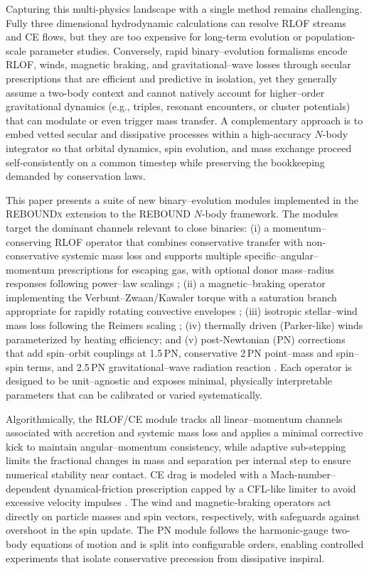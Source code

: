 \documentclass[11pt]{article}
\begin{document}
Capturing this multi-physics landscape with a single method remains challenging. Fully three dimensional hydrodynamic calculations can resolve RLOF streams and CE flows, but they are too expensive for long-term evolution or population-scale parameter studies. Conversely, rapid binary–evolution formalisms encode RLOF, winds, magnetic braking, and gravitational–wave losses through secular prescriptions that are efficient and predictive in isolation, yet they generally assume a two-body context and cannot natively account for higher–order gravitational dynamics (e.g., triples, resonant encounters, or cluster potentials) that can modulate or even trigger mass transfer. A complementary approach is to embed vetted secular and dissipative processes within a high-accuracy $N$-body integrator so that orbital dynamics, spin evolution, and mass exchange proceed self-consistently on a common timestep while preserving the bookkeeping demanded by conservation laws.

This paper presents a suite of new binary–evolution modules implemented in the \textsc{REBOUNDx} extension to the \textsc{REBOUND} $N$-body framework. The modules target the dominant channels relevant to close binaries: (i) a momentum–conserving RLOF operator that combines conservative transfer with non-conservative systemic mass loss and supports multiple specific–angular–momentum prescriptions for escaping gas, with optional donor mass–radius responses following power–law scalings \citep{Eggleton1983,Ritter1988,Hurley2000}; (ii) a magnetic–braking operator implementing the Verbunt–Zwaan/Kawaler torque with a saturation branch appropriate for rapidly rotating convective envelopes \citep{Verbunt1981,Kawaler1988}; (iii) isotropic stellar–wind mass loss following the Reimers scaling \citep{Reimers1975}; (iv) thermally driven (Parker-like) winds parameterized by heating efficiency; and (v) post-Newtonian (PN) corrections that add spin–orbit couplings at 1.5\,PN, conservative 2\,PN point–mass and spin–spin terms, and 2.5\,PN gravitational–wave radiation reaction \citep{Einstein1915,Peters1964,Kidder1995}. Each operator is designed to be unit–agnostic and exposes minimal, physically interpretable parameters that can be calibrated or varied systematically.

Algorithmically, the RLOF/CE module tracks all linear–momentum channels associated with accretion and systemic mass loss and applies a minimal corrective kick to maintain angular–momentum consistency, while adaptive sub-stepping limits the fractional changes in mass and separation per internal step to ensure numerical stability near contact. CE drag is modeled with a Mach-number–dependent dynamical-friction prescription capped by a CFL-like limiter to avoid excessive velocity impulses \citep{Ostriker1999}. The wind and magnetic-braking operators act directly on particle masses and spin vectors, respectively, with safeguards against overshoot in the spin update. The PN module follows the harmonic-gauge two-body equations of motion \citep{Kidder1995} and is split into configurable orders, enabling controlled experiments that isolate conservative precession from dissipative inspiral.
\end{document}
